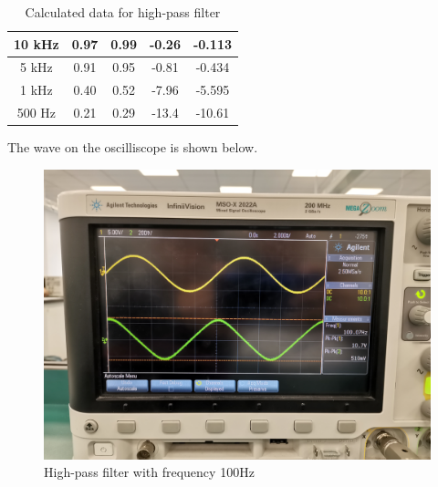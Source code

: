 \documentclass{article}
\begin{document}
\begin{table}[H]
\begin{tabular}{|c|c|c|c|c|}
10 kHz    & 0.97                                                                      & 0.99                                                                                  & -0.26                                                                                & -0.113                                                                                          \\ \hline
5 kHz     & 0.91                                                                      & 0.95                                                                                  & -0.81                                                                                & -0.434                                                                                          \\ \hline
1 kHz     & 0.40                                                                      & 0.52                                                                                  & -7.96                                                                                & -5.595                                                                                          \\ \hline
500 Hz    & 0.21                                                                      & 0.29                                                                                  & -13.4                                                                                & -10.61                                                                                          \\ \hline
\end{tabular}
\caption{Calculated data for high-pass filter}
\end{table}

The wave on the oscilliscope is shown below.
  \begin{figure}[H]
  \centering
  \includegraphics[width=.6\textwidth]{Figure9.jpg}
  \caption{High-pass filter with frequency 100Hz}
  \label{img} 
\end{figure}
\end{document}
